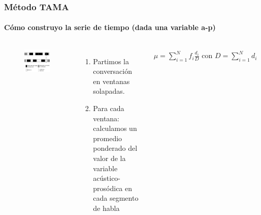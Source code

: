 \begin{frame}
  \frametitle{Método TAMA}
  \framesubtitle{Cómo construyo la serie de tiempo (dada una variable a-p)}

  \begin{columns}
    \begin{figure}[t]
      \includegraphics[width=\textwidth]{images/tama_improved.pdf}
    \end{figure}

    \begin{enumerate}
      \item Partimos la conversación en ventanas solapadas.
      \item Para cada ventana: calculamos un promedio ponderado del valor de la variable acústico-prosódica en cada segmento de habla
    \end{enumerate}

    \begin{align*}
      \mu = \sum\limits_{i=1}^N f_i \frac{d_i}{D} \text{ con } D = \sum\limits_{i=1}^N d_i
    \end{align*}
  \end{columns}

\end{frame}



